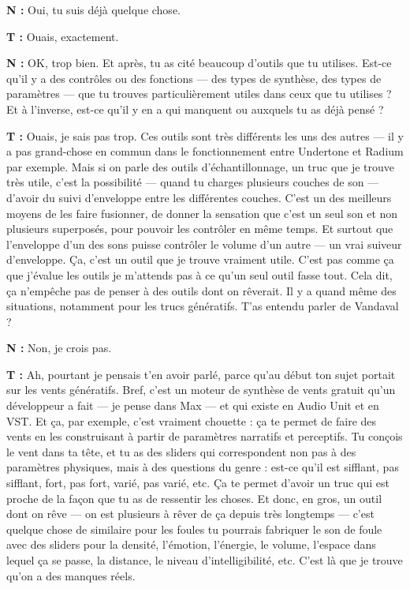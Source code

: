 ﻿\documentclass[12pt]{article}
\begin{document}
\textbf{N :} Oui, tu suis déjà quelque chose. 

\textbf{T :} Ouais, exactement. 

\textbf{N :} OK, trop bien. Et après, tu as cité beaucoup d'outils que tu utilises. Est-ce qu'il y a des contrôles ou des fonctions — des types de synthèse, des types de paramètres — que tu trouves particulièrement utiles dans ceux que tu utilises ? Et à l'inverse, est-ce qu'il y en a qui manquent ou auxquels tu as déjà pensé ? 

\textbf{T :} Ouais, je sais pas trop. Ces outils sont très différents les uns des autres — il y a pas grand-chose en commun dans le fonctionnement entre Undertone et Radium par exemple. Mais si on parle des outils d'échantillonnage, un truc que je trouve très utile, c'est la possibilité — quand tu charges plusieurs couches de son — d'avoir du suivi d'enveloppe entre les différentes couches. C'est un des meilleurs moyens de les faire fusionner, de donner la sensation que c'est un seul son et non plusieurs superposés, pour pouvoir les contrôler en même temps. Et surtout que l'enveloppe d'un des sons puisse contrôler le volume d'un autre — un vrai suiveur d'enveloppe. Ça, c'est un outil que je trouve vraiment utile. 
C'est pas comme ça que j'évalue les outils je m'attends pas à ce qu'un seul outil fasse tout. Cela dit, ça n'empêche pas de penser à des outils dont on rêverait. Il y a quand même des situations, notamment pour les trucs génératifs. T'as entendu parler de Vandaval ? 

\textbf{N :} Non, je crois pas. 

\textbf{T :} Ah, pourtant je pensais t'en avoir parlé, parce qu'au début ton sujet portait sur les vents génératifs. Bref, c'est un moteur de synthèse de vents gratuit qu'un développeur a fait — je pense dans Max — et qui existe en Audio Unit et en VST. Et ça, par exemple, c'est vraiment chouette : ça te permet de faire des vents en les construisant à partir de paramètres narratifs et perceptifs. Tu conçois le vent dans ta tête, et tu as des sliders qui correspondent non pas à des paramètres physiques, mais à des questions du genre : est-ce qu'il est sifflant, pas sifflant, fort, pas fort, varié, pas varié, etc. Ça te permet d'avoir un truc qui est proche de la façon que tu as de ressentir les choses. 
Et donc, en gros, un outil dont on rêve — on est plusieurs à rêver de ça depuis très longtemps — c'est quelque chose de similaire pour les foules tu pourrais fabriquer le son de foule avec des sliders pour la densité, l'émotion, l'énergie, le volume, l'espace dans lequel ça se passe, la distance, le niveau d'intelligibilité, etc. C'est là que je trouve qu'on a des manques réels. 
\end{document}
